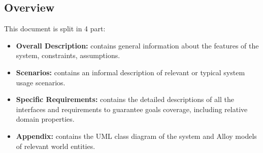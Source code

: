 \subsection{Overview}
This document is split in 4 part:
\begin{itemize}
\item \textbf{Overall Description:} contains general information about the features of the system, constraints, assumptions. 
\item \textbf{Scenarios:} contains an informal description of relevant or typical system usage scenarios.
\item \textbf{Specific Requirements:} contains the detailed descriptions of all the interfaces and requirements to guarantee goals coverage, including relative domain properties. 
\item \textbf{Appendix:} contains the UML class diagram of the system and Alloy models of relevant world entities.
\end{itemize}